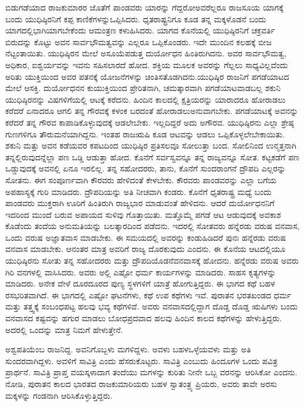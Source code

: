 ಬಿಡುಗಡೆಯಾದ ರಾಜಕುಮಾರರ ಜೊತೆಗೆ ಪಾಂಡವರು ಯಾರನ್ನು ಗೆದ್ದರೋ\break ಅವರೆಲ್ಲರೂ ರಾಜಸೂಯ ಯಾಗಕ್ಕೆ ಬಂದು ಯುಧಿಷ್ಠಿರನಿಗೆ ಕಪ್ಪ ಕಾಣಿಕೆಗಳನ್ನು\break ಒಪ್ಪಿಸಿದರು. ಧೃತರಾಷ್ಟ್ರನಿಗೂ ಕೂಡ ತನ್ನ ಮಕ್ಕಳೊಡನೆ ಬಂದು ಯಾಗದಲ್ಲಿ\break ಭಾಗಿಯಾಗಬೇಕೆಂದು ಆಮಂತ್ರಣ ಕಳುಹಿಸಿದರು. ಯಾಗದ ಕೊನೆಯಲ್ಲಿ ಯುಧಿಷ್ಠಿರನಿಗೆ ಚಕ್ರವರ್ತಿ ಬಿರುದನ್ನು ಕೊಟ್ಟು ಅವನ ಸಾರ್ವಭೌಮತ್ವವನ್ನು ಎಲ್ಲರೂ ಒಪ್ಪಿಕೊಂಡರು. ಇದೇ ಮುಂದಿನ ಕಲಹಕ್ಕೆ ಬೀಜ ನೆಟ್ಟಂತಾಯಿತು. ಯುಧಿಷ್ಠಿರನ ಮೇಲೆ ಅಸೂಯೆಪಡುತ್ತ ದುರ್ಯೋಧನ ಹಿಂತಿರುಗಿದನು. ಅವರ ಸಾರ್ವಭೌಮತ್ವ, ಅಧಿಕಾರ, ಐಶ್ವರ್ಯವನ್ನು ಇವನು ಸಹಿಸಲಾರದೆ ಹೋದ. ಶಕ್ತಿಯ ಮೂಲಕ ಅವರನ್ನು ಗೆಲ್ಲಲು ಸಾಧ್ಯವಿಲ್ಲವೆಂದು ಅರಿತು ಯುಕ್ತಿಯಿಂದ ಅವರ ಪತನಕ್ಕೆ ಯೋಜನೆಗಳನ್ನು ಚಿಂತಿಸತೊಡಗಿದನು.\break ಯುಧಿಷ್ಠಿರ ರಾಜನಿಗೆ ಪಗಡೆಯಾಟದ ಮೇಲೆ ಆಸಕ್ತಿ. ದುರ್ಯೋಧನನ ಕುಯುಕ್ತಿಯಿಂದ ಪ್ರೇರಿತನಾಗಿ, ಚಮತ್ಕಾರವಾಗಿ ಪಗಡೆಯಾಟವಾಡಬಲ್ಲ ಶಕುನಿ ಯುಧಿಷ್ಠಿರನನ್ನು ವಿಷಗಳಿಗೆಯಲ್ಲಿ ಆಟಕ್ಕೆ ಕರೆದನು. ಹಿಂದಿನ ಕಾಲದಲ್ಲಿ ಕ್ಷತ್ರಿಯರನ್ನು ಯಾರಾದರೂ ಹೋರಾಡಲು ಕರೆದರೆ ಏನಾದರೂ ಆಗಲಿ ತನ್ನ ಗೌರವಕ್ಕೆ ಕಳಂಕ ಬರದಂತೆ ಹೋರಾಡಲು\break ಅನುವಾಗಬೇಕು. ಪಗಡೆಯಾಟಕ್ಕೆ ಅವನನ್ನು ಕರೆದರೆ ತನ್ನ ಗೌರವ ಕಾಪಾಡಿಕೊಳ್ಳುವುದಕ್ಕೆ ಆಡಲೇಬೇಕು. ಇಲ್ಲದಿದ್ದರೆ ಅದು ಅಗೌರವ. ಯುಧಿಷ್ಠಿರನು ಎಲ್ಲಾ ಶ್ರೇಷ್ಠ ಗುಣಗಳಿಗೂ ತೌರುಮನೆಯಾಗಿದ್ದನು. ಇಂತಹ ರಾಜಋಷಿ ಕೂಡ ಆಟವನ್ನು ಆಡಲು ಒಪ್ಪಿಕೊಳ್ಳಲೇಬೇಕಾಯಿತು. ಶಕುನಿ ಮತ್ತು ಅವನ ಕಡೆಯವರ ಕಪಟದಿಂದ ಯುಧಿಷ್ಠಿರ ಪ್ರತಿಸಲವೂ ಸೋಲುತ್ತಾ ಬಂದ. ಸೋಲಿನಿಂದ ಉನ್ಮತ್ತನಾಗಿ ತನ್ನಲ್ಲಿರುವುದನ್ನೆಲ್ಲಾ ಪಣ ಒಡ್ಡಿ ಆಡುತ್ತಾ ಹೋದ. ಕೊನೆಗೆ ಸರ್ವಸ್ವವನ್ನೂ ತನ್ನ ರಾಜ್ಯವನ್ನೂ ಸೋತ. ಕಟ್ಟಕಡೆಗೆ ಪಣ ಒಡ್ಡುವುದಕ್ಕೆ ಅವನಲ್ಲಿ ಏನೂ ಇರಲಿಲ್ಲ. ತನ್ನ ಸಹೋದರರು, ತಾನು, ಕೊನೆಗೆ ಸುಂದರಾಂಗನೆ ದ್ರೌಪದಿ ಎಲ್ಲರನ್ನು ಸೋತನು. ಈಗ ಸಂಪೂರ್ಣವಾಗಿ ಕೌರವರು ಹೇಳಿದಂತೆ ಕೇಳಬೇಕು. ಕೌರವರು ಪಾಂಡವರನ್ನು ಎಲ್ಲಾ ಬಗೆಯ ಅಪಹಾಸ್ಯಕ್ಕೆ ಗುರಿ ಮಾಡಿದರು. ದ್ರೌಪದಿಯನ್ನು ಅತಿ ನೀಚವಾಗಿ ಕಂಡರು. ಕೊನೆಗೆ ಧೃತರಾಷ್ಟ್ರ ಮಧ್ಯೆ ಬಂದು ಪಾಂಡವರು ಮುಕ್ತರಾಗಿ ಊರಿಗೆ ಹಿಂತಿರುಗಿ ರಾಜ್ಯಭಾರ ಮಾಡುವಂತೆ ಹೇಳಿದನು. ಆದರೆ ದುರ್ಯೋಧನನಿಗೆ ಇದರಿಂದ ಮುಂದೆ ಬರುವ ಅಪಾಯದ ಸುಳಿವು ಗೊತ್ತಾಯಿತು. ಮತ್ತೊಮ್ಮೆ ಪಗಡೆ ಆಟ ಆಡುವುದಕ್ಕೆ ಅವಕಾಶ ಕೊಡೆಂದು ತಂದೆಯ ಅನುಮತಿಯನ್ನು ಬಲತ್ಕಾರದಿಂದ ಪಡೆದನು. ಇದರಲ್ಲಿ ಸೋತವರು ಹನ್ನೆರಡು ವರುಷ ವನವಾಸ, ಒಂದು ವರುಷ ಅಜ್ಞಾತವಾಸ ಮಾಡಬೇಕು. ಈ ಸಮಯದಲ್ಲಿ ಅವರನ್ನು ಕಂಡುಹಿಡಿದರೆ ಪುನಃ ಹನ್ನೆರಡು ವರುಷ ವನವಾಸ ಮಾಡಬೇಕು. ಆನಂತರ ಮಾತ್ರ ಅವರಿಗೆ ರಾಜ್ಯ ದೊರಕುವುದು ಎಂದನು. ಈ ಕೊನೆಯ ಆಟದಲ್ಲಿಯೂ ಯುಧಿಷ್ಠಿರನು ಸೋತು ತನ್ನ ಸಹೋದರರು ಮತ್ತು ದ್ರೌಪದಿಯೊಡನೆ\break ವನವಾಸಕ್ಕೆ ಹೋದನು. ಹನ್ನೆರಡು ವರುಷ ಅವರು ಗಿರಿ ವನಗಳಲ್ಲಿ ವಾಸಿಸಿದರು. ಅವರು ಅಲ್ಲಿ ಎಷ್ಟೋ ಧರ್ಮ ಕಾರ್ಯಗಳನ್ನು ಮಾಡಿದರು. ಸಾಹಸ ಕೃತ್ಯಗಳನ್ನು ಮಾಡಿದರು. ಅನೇಕ ವೇಳೆ ದೂರದೂರದ ಪುಣ್ಯ ಸ್ಥಳಗಳಿಗೆ ಯಾತ್ರೆ ಹೋಗುತ್ತಿದ್ದರು. ಈ ಭಾಗದ ಕಥೆ ಬಹಳ ರಸಭರಿತವಾಗಿದೆ. ಈ ಭಾಗದಲ್ಲಿ ಎಷ್ಟೋ ಘಟನೆಗಳು, ಕಥೆ ಉಪ ಕಥೆಗಳು ಇವೆ. ಪುರಾತನ ಭರತಖಂಡದ ಧರ್ಮ ಮತ್ತು ತತ್ತ್ವಕ್ಕೆ ಸಂಬಂಧಪಟ್ಟ ಹಲವು ಭವ್ಯ ಕಥೆಗಳಿವೆ. ಅವರು ವನವಾಸದಲ್ಲಿದ್ದಾಗ ದೊಡ್ಡ ದೊಡ್ಡ ಋಷಿಗಳು ಬಂದು ವನವಾಸದ ಕಷ್ಟವನ್ನು ಹಗುರ ಮಾಡಲು ಬೋಧಪ್ರದವಾದ ಹಲವು ಹಿಂದಿನ ಕಾಲದ ಕಥೆಗಳನ್ನು ಹೇಳುತ್ತಿದ್ದರು. ಅದರಲ್ಲಿ ಒಂದನ್ನು ಮಾತ್ರ ನಿಮಗೆ ಹೇಳುತ್ತೇನೆ.

\vskip 0.1cm

ಅಶ್ವಪತಿಯೆಂಬ ರಾಜನಿದ್ದ. ಅವನಿಗೊಬ್ಬಳು ಮಗಳಿದ್ದಳು. ಅವಳು ಬಹಳ\break ಒಳ್ಳೆಯವಳು ಮತ್ತು ಅತಿ ಸುಂದರವಾಗಿದ್ದಳು. ಅವಳಿಗೆ ಸಾವಿತ್ರಿ ಎಂದು ಹೆಸರು\break ಕೊಟ್ಟರು. ಸಾವಿತ್ರಿ ಎಂಬುದು ಹಿಂದೂಗಳ ಒಂದು ಪವಿತ್ರ ಪ್ರಾರ್ಥನೆ. ಸಾವಿತ್ರಿ ಪ್ರಾಪ್ತ ವಯಸ್ಕಳಾದಾಗ ತಂದೆಯು ಮಗಳನ್ನು ಕುರಿತು ನೀನೇ ಒಬ್ಬ ವರನನ್ನು ಆರಿಸಿಕೋ ಎಂದನು. ನೋಡಿ, ಪುರಾತನ ಕಾಲದ ಭಾರತದ ರಾಜಕುಮಾರಿಯರು ಬಹಳ ಸ್ವಾತಂತ್ರ್ಯ ಪ್ರಿಯರು, ಅವರು ತಾವೇ ಅರಸು ಮಕ್ಕಳನ್ನು ಗಂಡನಾಗಿ ಆರಿಸಿಕೊಳ್ಳುತ್ತಿದ್ದರು.

